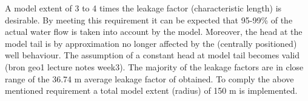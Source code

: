 \begin{table}[h!]
\centering
\caption{Lambda (m) overview per location}
\end{table}

A model extent of 3 to 4 times the leakage factor (characteristic length) is desirable. By meeting this requirement it can be expected that 95-99\% of the actual water flow is taken into account by the model. Moreover, the head at the model tail is by approximation no longer affected by the (centrally positioned) well behaviour. The assumption of a constant head at model tail becomes valid (bron geo1 lecture notes week3). The majority of the leakage factors are in close range of the 36.74 m average leakage factor of obtained. To comply the above mentioned requirement a total model extent (radius) of 150 m is implemented.
